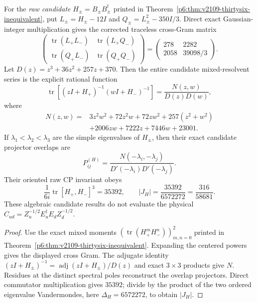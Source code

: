\documentclass[11pt,a4paper]{article}
\begin{document}
\begin{proposition}
\label{p6:prop:v240-directed-colour-double-resolvent}
For the \emph{raw candidate} $H_\pm=B_\pm B_\pm^\dagger$ printed in
Theorem~\ref{p6:thm:v2109-thirtysix-inequivalent}, put
$L_\pm=H_\pm-12I$ and $Q_\pm=L_\pm^2-350I/3$.
Direct exact Gaussian-integer multiplication gives the corrected
traceless cross-Gram matrix
\begin{equation}\label{p6:eq:v240-cross-gram}
 \boxed{\begin{pmatrix}
 \operatorname{tr}(L_+L_-) & \operatorname{tr}(L_+Q_-)\\
 \operatorname{tr}(Q_+L_-) & \operatorname{tr}(Q_+Q_-)
 \end{pmatrix}
 =\begin{pmatrix}278&2282\\2058&39098/3\end{pmatrix}.}
\end{equation}
Let $D(z)=z^3+36z^2+257z+370$. Then the entire candidate
mixed-resolvent series is the explicit rational function
\begin{equation}\label{p6:eq:v240-candidate-double-resolvent}
 \boxed{\operatorname{tr}[(zI+H_+)^{-1}(wI+H_-)^{-1}]
       =\frac{N(z,w)}{D(z)D(w)},}
\end{equation}
where
\[
 \boxed{\begin{aligned}
 N(z,w)={}&3z^2w^2+72z^2w+72zw^2
     +257(z^2+w^2)\\
    &+2006zw+7222z+7446w+23001.
 \end{aligned}}
\]
If $\lambda_1<\lambda_2<\lambda_3$ are the simple eigenvalues
of $H_\pm$, then their exact candidate projector overlaps are
\[
 \boxed{P^{(H)}_{ij}=\frac{N(-\lambda_i,-\lambda_j)}
                    {D'(-\lambda_i)D'(-\lambda_j)}.}
\]
Their oriented raw CP invariant obeys
\[
 \boxed{\frac1{6i}\operatorname{tr}[H_+,H_-]^3=35392,
       \qquad |J_H|=\frac{35392}{6572272}=\frac{316}{58681}.}
\]
These algebraic candidate results do not evaluate the physical
$C_{ud}=Z_u^{-1/2}E_u^\dagger E_dZ_d^{-1/2}$.
\end{proposition}
\begin{proof}
Use the exact mixed moments
$\left(\operatorname{tr}(H_+^mH_-^n)\right)_{m,n=0}^2$
printed in Theorem~\ref{p6:thm:v2109-thirtysix-inequivalent}.
Expanding the centered powers gives the displayed cross Gram.
The adjugate identity
$(zI+H_\pm)^{-1}=\operatorname{adj}(zI+H_\pm)/D(z)$
and exact $3\times3$ products give $N$.
Residues at the distinct spectral poles reconstruct the overlap
projectors. Direct commutator multiplication gives $35392$; divide
by the product of the two ordered eigenvalue Vandermondes, here
$\Delta_H=6572272$, to obtain $|J_H|$.
\end{proof}
\end{document}

